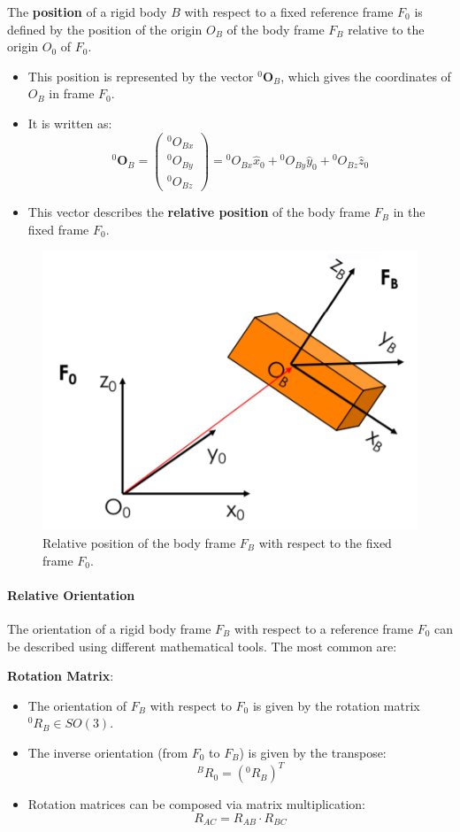 The \textbf{position} of a rigid body $B$ with respect to a fixed reference frame $F_0$ is defined by the position of the origin $O_B$ of the body frame $F_B$ relative to the origin $O_0$ of $F_0$.

\begin{itemize}
  \item This position is represented by the vector ${}^0\mathbf{O}_B$, which gives the coordinates of $O_B$ in frame $F_0$.
  \item It is written as:
    \[
    {}^0\mathbf{O}_B = 
    \begin{pmatrix}
      {}^0 O_{Bx} \\
      {}^0 O_{By} \\
      {}^0 O_{Bz}
    \end{pmatrix}
    =
    {}^0 O_{Bx} \hat{x}_0 + {}^0 O_{By} \hat{y}_0 + {}^0 O_{Bz} \hat{z}_0
    \]
  \item This vector describes the \textbf{relative position} of the body frame $F_B$ in the fixed frame $F_0$.
\end{itemize}

\begin{figure}[H]
  \centering
  \includegraphics[width=0.5\linewidth]{imgs/relative_position.png}
  \caption{Relative position of the body frame $F_B$ with respect to the fixed frame $F_0$.}
\end{figure}

\hfill

\paragraph{Relative Orientation} \hfill

The orientation of a rigid body frame $F_B$ with respect to a reference frame $F_0$ can be described using different mathematical tools. The most common are:

\textbf{Rotation Matrix}:
\begin{itemize}
  \item The orientation of $F_B$ with respect to $F_0$ is given by the rotation matrix ${}^0R_B \in SO(3)$.
  \item The inverse orientation (from $F_0$ to $F_B$) is given by the transpose:
  \[
  {}^B R_0 = ({}^0 R_B)^T
  \]
  \item Rotation matrices can be composed via matrix multiplication:
  \[
  R_{AC} = R_{AB} \cdot R_{BC}
  \]
\end{itemize}

